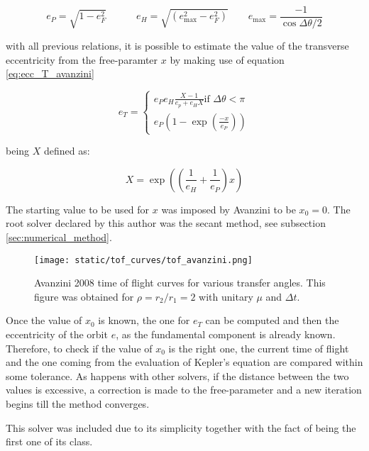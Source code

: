 \begin{equation}
  e_P = \sqrt{1 - e_F^2}\quad\quad\quad
  e_H = \sqrt{(e_\text{max}^2 - e_F^2)}\quad\quad
  e_\text{max} = \frac{-1}{\cos{\Delta \theta / 2}}
  \label{eq:ecc_aux}
\end{equation}

with all previous relations, it is possible to estimate the value of the
transverse eccentricity from the free-paramter $x$ by making use of equation
\ref{eq:ecc_T_avanzini}

\begin{equation}
  e_T =
  \begin{cases}
    e_P e_H \frac{X - 1}{e_p + e_H X} \text{if $\Delta \theta < \pi$} \\
    e_P \left(1 - \exp{\left(\frac{-x}{e_P} \right)} \right)
  \end{cases}
  \label{eq:ecc_T_avanzini}
\end{equation}

being $X$ defined as:

\begin{equation}
  X = \exp{\left(\left(\frac{1}{e_H} + \frac{1}{e_P} \right)x\right)}
\end{equation}

The starting value to be used for $x$ was imposed by Avanzini to be $x_0 = 0$.
The root solver declared by this author was the secant method, see subsection
\ref{sec:numerical_method}.

\vspace{0.5cm}
\begin{figure}[h]
  \centering
  \texttt{[image: static/tof\_curves/tof\_avanzini.png]}
  \caption[Avanzini 2008 time of flight curves]{Avanzini 2008 time of flight curves for various transfer angles. This
    figure was obtained for $\rho=r_2/r_1=2$ with unitary $\mu$ and $\Delta t$.}
  \label{fig:tof_avanzini}
\end{figure}

Once the value of $x_0$ is known, the one for $e_T$ can be computed and then
the eccentricity of the orbit $e$, as the fundamental component is already
known. Therefore, to check if the value of $x_0$ is the right one, the current
time of flight and the one coming from the evaluation of Kepler's equation are
compared within some tolerance. As happens with other solvers, if the distance
between the two values is excessive, a correction is made to the free-parameter
and a new iteration begins till the method converges.

This solver was included due to its simplicity together with the fact of being
the first one of its class.

